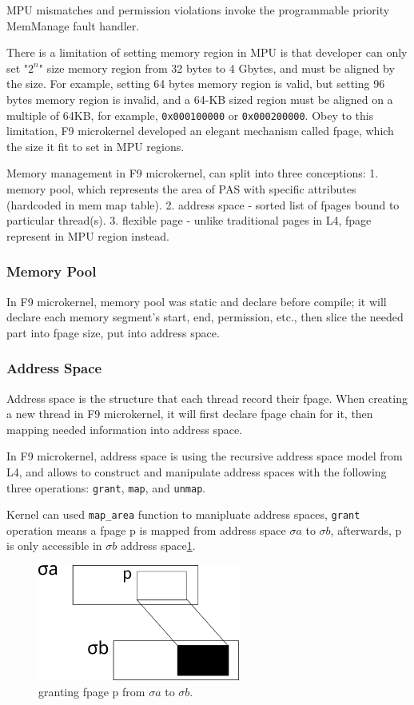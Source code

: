 \documentclass[10pt,preprint,nocopyrightspace]{sigplanconf}
\begin{document}
MPU mismatches and permission violations invoke the programmable priority MemManage fault handler.

There is a limitation of setting memory region in MPU is that developer can only set "$2^n$" size memory region from 32 bytes to 4 Gbytes, and must be aligned by the size\cite{yiu2013definitive,st2016managing}. For example, setting 64 bytes memory region is valid, but setting 96 bytes memory region is invalid, and a 64-KB sized region must be aligned on a multiple of 64KB, for example, \verb|0x000100000| or \verb|0x000200000|. Obey to this limitation, F9 microkernel developed an elegant mechanism called fpage, which the size it fit to set in MPU regions.

Memory management in F9 microkernel, can split into three conceptions: 1. memory pool, which represents the area of PAS with specific attributes (hardcoded in mem map table). 2. address space - sorted list of fpages bound to particular thread(s). 3. flexible page - unlike traditional pages in L4, fpage represent in MPU region instead. 

\subsubsection{Memory Pool}
In F9 microkernel, memory pool was static and declare before compile; it will declare each memory segment's start, end, permission, etc., then slice the needed part into fpage size, put into address space.

\subsubsection{Address Space}
Address space is the structure that each thread record their fpage. When creating a new thread in F9 microkernel, it will first declare fpage chain for it, then mapping needed information into address space.

In F9 microkernel, address space is using the recursive address space model from L4, and allows to construct and manipulate address spaces with the following three operations: \verb|grant|, \verb|map|, and \verb|unmap|\cite{volp2002design}.

Kernel can used \verb|map_area| function to manipluate address spaces, \verb|grant| operation means a fpage p is mapped from address space $\sigma{a}$ to $\sigma{b}$, afterwards, p is only accessible in $\sigma{b}$ address space\ref{fig:grant}.

\begin{figure}[H]
	\begin{center}
		\includegraphics[height=1.5in]{picture/grant.png}
	\end{center}
	\caption{granting fpage p from $\sigma{a}$ to $\sigma{b}$.}
	\label{fig:grant}
\end{figure}
\end{document}
